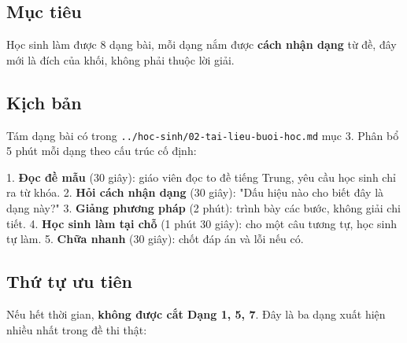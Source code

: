 \documentclass[11pt, a4paper]{article}
\begin{document}
\subsection{Mục tiêu}

Học sinh làm được 8 dạng bài, mỗi dạng nắm được \textbf{cách nhận dạng} từ đề, đây mới là đích của khối, không phải thuộc lời giải.

\subsection{Kịch bản}

Tám dạng bài có trong \texttt{../hoc-sinh/02-tai-lieu-buoi-hoc.md} mục 3. Phân bổ 5 phút mỗi dạng theo cấu trúc cố định:

1. \textbf{Đọc đề mẫu} (30 giây): giáo viên đọc to đề tiếng Trung, yêu cầu học sinh chỉ ra từ khóa.
2. \textbf{Hỏi cách nhận dạng} (30 giây): "Dấu hiệu nào cho biết đây là dạng này?"
3. \textbf{Giảng phương pháp} (2 phút): trình bày các bước, không giải chi tiết.
4. \textbf{Học sinh làm tại chỗ} (1 phút 30 giây): cho một câu tương tự, học sinh tự làm.
5. \textbf{Chữa nhanh} (30 giây): chốt đáp án và lỗi nếu có.

\subsection{Thứ tự ưu tiên}

Nếu hết thời gian, \textbf{không được cắt Dạng 1, 5, 7}. Đây là ba dạng xuất hiện nhiều nhất trong đề thi thật:

\end{document}
